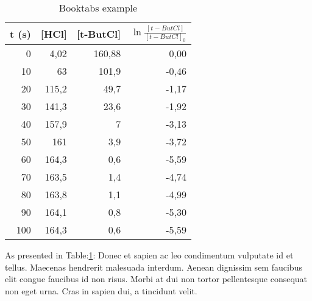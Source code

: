 \begin{table}[htbp]
  \centering
  \caption{Booktabs example}
  \vspace{-16.5pt}
    \begin{tabular}{rrrr}
    \toprule
    t (s) & [HCl] & [t-ButCl] & $\ln\frac{[t-ButCl]}{[t-ButCl]_0}$ \\
    \midrule
    0     & 4,02  & 160,88 & 0,00 \\
    10    & 63    & 101,9 & -0,46 \\
    20    & 115,2 & 49,7  & -1,17 \\
    30    & 141,3 & 23,6  & -1,92 \\
    40    & 157,9 & 7     & -3,13 \\
    50    & 161   & 3,9   & -3,72 \\
    60    & 164,3 & 0,6   & -5,59 \\
    70    & 163,5 & 1,4   & -4,74 \\
    80    & 163,8 & 1,1   & -4,99 \\
    90    & 164,1 & 0,8   & -5,30 \\
    100   & 164,3 & 0,6   & -5,59 \\
    \bottomrule
    \end{tabular}
  \label{tab:thisislabel}
\end{table}

As presented in Table:\ref{tab:thisislabel}: Donec et sapien ac leo condimentum vulputate id et tellus. Maecenas hendrerit malesuada interdum. Aenean dignissim sem faucibus elit congue faucibus id non risus. Morbi at dui non tortor pellentesque consequat non eget urna. Cras in sapien dui, a tincidunt velit.
